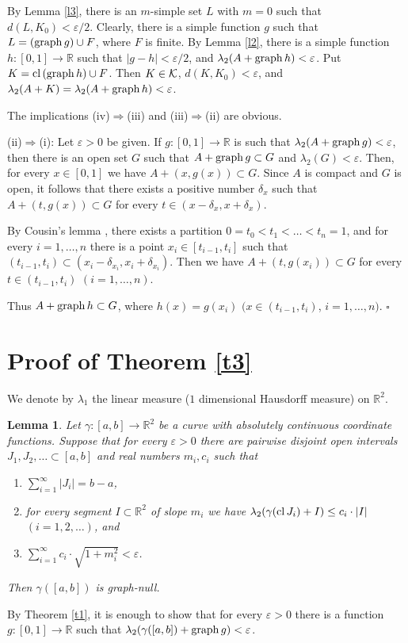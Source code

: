 \documentclass[12pt]{article}
\newtheorem{lemma}[theorem]{Lemma}
\def\rr{{\mathbb R}}
\def\kk{{\cal K}}
\def\sik{{\rr}^2}
\def\su{\subset}
\def\ga{\gamma}
\def\de{\delta}
\def\ep{\varepsilon}
\def\la{\lambda}
\def\cd{\cdot}
\def\stb{,\ldots ,}
\def\cl{{\rm cl}\, }
\def\nl{[0,1]}
\def\proof{\noindent {\bf Proof.} }
\def\graph{{\rm graph}\, }
\def\akkor{\Longrightarrow}
\begin{document}
By Lemma \ref{l3}, there is an $m$-simple set $L$ with $m=0$ such that
$d(L,K_0 )<\ep /2$. Clearly, there is a simple function $g$ such that
$L=(\graph g)\cup F$, where $F$ is finite. By Lemma \ref{l2}, there is a simple
function $h\colon \nl \to \rr$ such that $|g-h|<\ep /2$, and
$\la _2 (A+\graph h) <\ep$. Put $K= \cl (\graph h) \cup F$. Then $K\in \kk$,
$d(K,K_0 )<\ep$, and $\la _2 (A+K)=\la _2 (A+\graph h) <
\ep$. 

The implications (iv)$\akkor$(iii) and (iii)$\akkor$(ii) are obvious.

(ii)$\akkor$(i): Let $\ep >0$ be given. If $g\colon \nl \to \rr$ is such
that $\la _2 (A+\graph g)<\ep$, then there is an open set $G$ such that
$A+\graph g\su G$ and $\la _2 (G)<\ep$. Then, for every $x\in \nl$ we have
$A+(x,g(x))\su G$. Since $A$ is compact and $G$ is open, it follows that
there exists a positive number $\de _x$ such that
$A+(t,g(x))\su G$ for every $t\in (x-\de _x ,x+\de _x )$.

By Cousin's lemma \cite[Theorem 1.3, p. 9]{BBT}, there exists a partition
$0=t_0 <t_1 <\ldots <t_n =1$, and for every $i=1\stb n$ there is a point
$x_i \in [t_{i-1},t_i ]$ such that $(t_{i-1},t_i )\su (x_i -\de _{x_i} ,
x_i +\de _{x_i} )$. Then we have $A+(t,g(x_i ))\su G$ for every $t\in
(t_{i-1},t_i )$ $(i=1\stb n)$.

Thus $A+\graph h\su G$, where $h(x)=g(x_i )$ $(x\in (t_{i-1},t_i )$,
$i=1\stb n)$. \hfill $\square$

\section{Proof of Theorem \ref{t3}}\label{s3}
We denote by $\la _1$ the linear measure ($1$ dimensional Hausdorff measure)
on $\sik$.
\begin{lemma} \label{l4}
Let $\ga \colon [a,b]\to \sik$ be a curve with absolutely continuous coordinate
functions. Suppose that for every $\ep >0$ there are pairwise disjoint
open intervals $J_1 ,J_2 ,\ldots \su [a,b]$ and real numbers $m_i ,c_i$
such that
\begin{enumerate}[{\rm (i)}]
\item $\sum_{i=1}^\infty |J_i |=b-a$,
\item for every segment $I\su \sik$ of slope $m_i$ we have
$\la _2 (\ga (\cl J_i )+I)\le c_i \cd |I|$ $(i=1,2,\ldots )$, and
\item $\sum_{i=1}^\infty c_i \cd \sqrt{1+m_i^2} <\ep$.
\end{enumerate}
Then $\ga ([a,b] )$ is graph-null. 
\end{lemma}
\proof
By Theorem \ref{t1}, it is enough to show that for every $\ep >0$
there is a function $g\colon \nl \to \rr$ such that $\la _2 (\ga ([a,b] ) +
\graph g) <\ep$.
\end{document}
